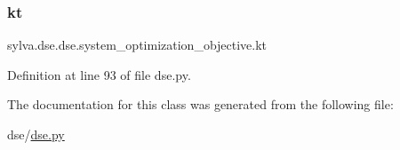 \subsubsection{\texorpdfstring{kt}{kt}}
{\footnotesize\ttfamily sylva.\+dse.\+dse.\+system\+\_\+optimization\+\_\+objective.\+kt}



Definition at line 93 of file dse.\+py.



The documentation for this class was generated from the following file\+:\begin{DoxyCompactItemize}
\item 
dse/\hyperlink{dse_8py}{dse.\+py}\end{DoxyCompactItemize}
